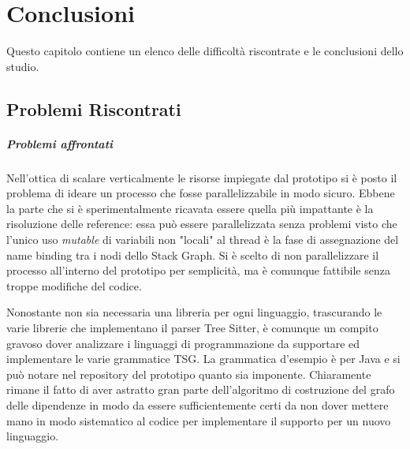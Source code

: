\chapter{Conclusioni}

Questo capitolo contiene un elenco delle difficolt\`a riscontrate e le conclusioni dello studio.

\section{Problemi Riscontrati}

\paragraph{Problemi affrontati}

Nell'ottica di scalare verticalmente le risorse impiegate dal prototipo si \`e posto il problema di ideare un processo che fosse parallelizzabile in modo sicuro. Ebbene la parte che si \`e sperimentalmente ricavata essere quella pi\`u impattante \`e la risoluzione delle reference: essa pu\`o essere parallelizzata senza problemi visto che l'unico uso \emph{mutable} di variabili non "locali" al thread \`e la fase di assegnazione del name binding tra i nodi dello Stack Graph. Si \`e scelto di non parallelizzare il processo all'interno del prototipo per semplicit\`a, ma \`e comunque fattibile senza troppe modifiche del codice.


Nonostante non sia necessaria una libreria per ogni linguaggio, trascurando le varie librerie che implementano il parser Tree Sitter, \`e comunque un compito gravoso dover analizzare i linguaggi di programmazione da supportare ed implementare le varie grammatice TSG. La grammatica d'esempio \`e per Java e si pu\`o notare nel repository del prototipo quanto sia imponente. Chiaramente rimane il fatto di aver astratto gran parte dell'algoritmo di costruzione del grafo delle dipendenze in modo da essere sufficientemente certi da non dover mettere mano in modo sistematico al codice per implementare il supporto per un nuovo linguaggio.

